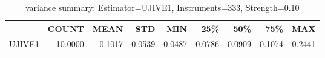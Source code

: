\begin{table}[ht]
\centering
\caption{variance summary: Estimator=UJIVE1, Instruments=333, Strength=0.10}
\begin{tabular}{lrrrrrrrr}
\toprule
 & COUNT & MEAN & STD & MIN & 25\% & 50\% & 75\% & MAX \\
\midrule
UJIVE1 & 10.0000 & 0.1017 & 0.0539 & 0.0487 & 0.0786 & 0.0909 & 0.1074 & 0.2441 \\
\bottomrule
\end{tabular}
\end{table}

